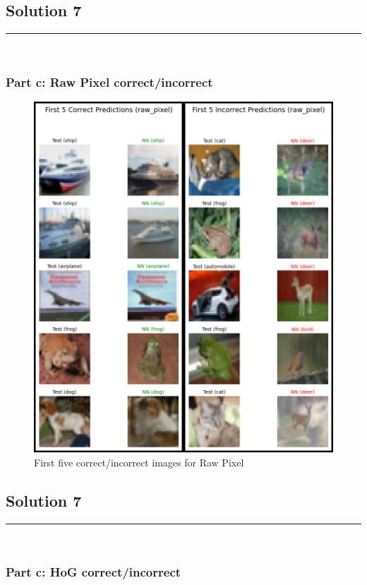 \documentclass{article}
\begin{document}
\newpage

\subsection*{Solution 7}
\noindent\rule{\textwidth}{0.4pt}\\
\subsubsection*{Part c:  Raw Pixel correct/incorrect}

\begin{figure}[h]
  \includegraphics[height=0.75\textheight,width=\textwidth]{raw_pixel.png}
  \caption{First five correct/incorrect images for Raw Pixel}
\end{figure}

\newpage

\subsection*{Solution 7}
\noindent\rule{\textwidth}{0.4pt}\\
\subsubsection*{Part c:  HoG correct/incorrect}
\end{document}
